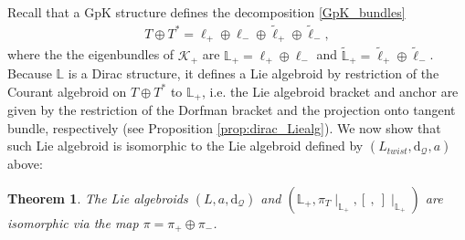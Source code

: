 \documentclass[letterpaper,12pt]{article}
\newcommand{\TT}{{T\oplus T^*}}
\newcommand{\KK}{\mathcal{K}}
\newcommand{\QQ}{\mathcal{Q}}
\newcommand{\rd}{\mathrm{d}}
\newcommand{\Lb}{\mathbb{L}}
\newcommand{\ellt}{{\tl{\ell}}}
\newcommand{\brac}{[\ ,\ ]}
\newcommand{\wtl}{\widetilde}
\def\tl{\tilde}
\newtheorem{theorem}{Theorem}[section]
\theoremstyle{definition}
\theoremstyle{remark}
\theoremstyle{examples}
\begin{document}
Recall that a GpK structure defines the decomposition \eqref{GpK_bundles}
\begin{align*}
\TT=\ell_+\oplus\ell_-\oplus \ellt_+\oplus \ellt_-,
\end{align*}
where the the eigenbundles of $\KK_+$ are $\Lb_+=\ell_+\oplus\ell_-$ and $\wtl{\Lb}_+=\ellt_+\oplus \ellt_-$. Because $\Lb$ is a Dirac structure, it defines a Lie algebroid by restriction of the Courant algebroid on $\TT$ to $\Lb_+$, i.e. the Lie algebroid bracket and anchor are given by the restriction of the Dorfman bracket and the projection onto tangent bundle, respectively (see Proposition \ref{prop:dirac_Liealg}). We now show that such Lie algebroid is isomorphic to the Lie algebroid defined by $(L_{twist},\rd_\QQ,a)$ above:
\begin{theorem}
The Lie algebroids $(L,a,\rd_\QQ)$ and $(\Lb_+,\pi_T\!\!\mid_{\Lb_+},\brac\!\!\mid_{\Lb_+})$ are isomorphic via the map $\pi=\pi_+\oplus \pi_-$.
\end{theorem}
\end{document}
